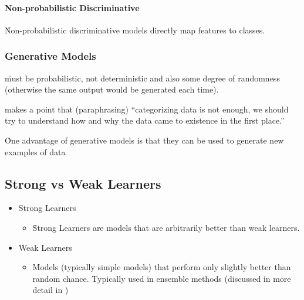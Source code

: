 \paragraph{Non-probabilistic Discriminative}

\r{Non-probabilistic discriminative models directly map features to classes.}

\subsubsection{Generative Models}


\r{must be probabilistic, not deterministic and also some degree of randomness (otherwise the same output would be generated each time).}




\r{ makes a point that (paraphrasing) ``categorizing data is not enough, we should try to understand how and why the data came to existence in the first place.''}


\r{One advantage of generative models is that they can be used to generate new examples of data}

\subsection{Strong vs Weak Learners}


\begin{itemize}[noitemsep,topsep=0pt]
	\item Strong Learners
	\begin{itemize}[noitemsep,topsep=0pt]
		\item \r{Strong Learners are models that are arbitrarily better than weak learners.}
	\end{itemize}
	\item Weak Learners
	\begin{itemize}[noitemsep,topsep=0pt]
		\item \r{Models (typically simple models) that perform only slightly better than random chance. Typically used in ensemble methods (discussed in more detail in \ALR)}
	\end{itemize}
\end{itemize}

